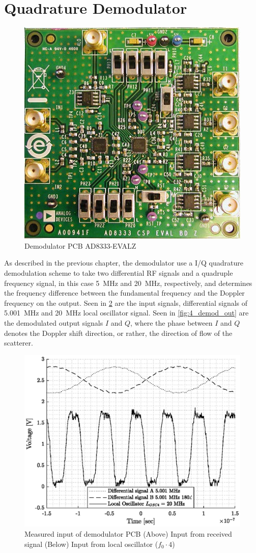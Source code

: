 \section{Quadrature Demodulator}
\begin{figure}[htbp]
	\centering
	\includegraphics[width=.8\textwidth]{Figures/4_demod_pcb_pic.jpg}
	\caption{Demodulator PCB AD8333-EVALZ}
	\label{fig:4_demod_pcb_pic}
\end{figure}
As described in the previous chapter, the demodulator use a I/Q quadrature demodulation scheme to take two differential RF signals and a quadruple frequency signal, in this case \qty{5}{\mega\hertz} and \qty{20}{\mega\hertz}, respectively, and determines the frequency difference between the fundamental frequency and the Doppler frequency on the output. Seen in \cref{fig:4_demod_in} are the input signals, differential signals of \qty{5.001}{\mega\hertz} and \qty{20}{\mega\hertz} local oscillator signal. Seen in \cref{fig:4_demod_out} are the demodulated output signals $I$ and $Q$, where the phase between $I$ and $Q$ denotes the Doppler shift direction, or rather, the direction of flow of the scatterer.
\begin{figure}[htbp]
	\centering
	\includegraphics[width=.8\textwidth]{Figures/4_demod_pcb_in.eps}
	\caption[Measured input of demodulator PCB]{Measured input of demodulator PCB (Above) Input from received signal (Below) Input from local oscillator ($f_{0}\cdot4$)}
	\label{fig:4_demod_in}
\end{figure}
